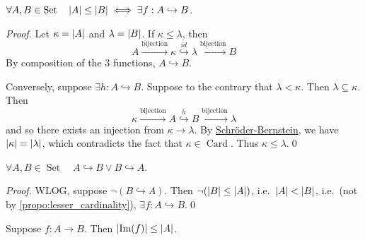 \documentclass[notoc,notitlepage]{tufte-book}
\DeclareMathOperator{\Card}{Card }
\DeclareMathOperator{\Set}{Set }
\DeclareMathOperator{\Img}{Im }
\begin{document}
\begin{propo}\label{propo:lesser_cardinality}
  $\forall A, B \in \Set \quad \abs{A} \leq \abs{B} \iff \exists f : A \hookrightarrow B$.
\end{propo}

\begin{proof}
  Let $\kappa = \left|A\right|$ and $\lambda = \left|B\right|$. If $\kappa \leq \lambda$, then
  \begin{equation*}
    A \overset{\text{bijection}}{\to} \kappa \overset{id}{\hookrightarrow} \lambda \overset{\text{bijection}}{\to} B
  \end{equation*}
  By composition of the 3 functions, $A \hookrightarrow B$.

  Conversely, suppose $\exists h : A \hookrightarrow B$. Suppose to the contrary that $\lambda < \kappa$. Then $\lambda \subseteq \kappa$. Then
  \begin{equation*}
    \kappa \overset{\text{bijection}}{\to} A \overset{h}{\hookrightarrow} B \overset{\text{bijection}}{\to} \lambda
  \end{equation*}
  and so there exists an injection from $\kappa \to \lambda$. By \hyperref[lemma:schroder_bernstein_theorem]{Schr\"{o}der-Bernstein}, we have $\left|\kappa\right| = \left|\lambda\right|$, which contradicts the fact that $\kappa \in \Card$. Thus $\kappa \leq \lambda$.\qed\
\end{proof}

\begin{crly}\label{crly:cardinalities_are_always_comparable}
  $\forall A, B \in \Set \quad A \hookrightarrow B \lor B \hookrightarrow A$.
\end{crly}

\begin{proof}
  WLOG, suppose $\neg ( B \hookrightarrow A )$. Then $\neg( \left|B\right| \leq \left|A\right| )$, i.e.\ $\left|A\right| < \left|B\right|$, i.e.\ (not by \cref{propo:lesser_cardinality}), $\exists f : A \hookrightarrow B$.\qed
\end{proof}

\begin{propo}\label{propo:functions_are_lossy_compressions}
  Suppose $f : A \to B$. Then $\abs{\Img(f)} \leq \abs{A}$.
\end{propo}
\end{document}
